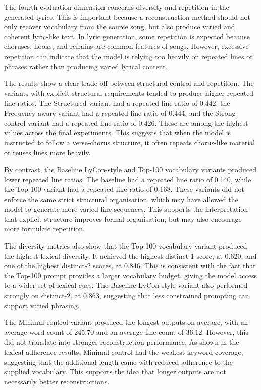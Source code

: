 The fourth evaluation dimension concerns diversity and repetition in the generated lyrics. This is important because a reconstruction method should not only recover vocabulary from the source song, but also produce varied and coherent lyric-like text. In lyric generation, some repetition is expected because choruses, hooks, and refrains are common features of songs. However, excessive repetition can indicate that the model is relying too heavily on repeated lines or phrases rather than producing varied lyrical content.

The results show a clear trade-off between structural control and repetition. The variants with explicit structural requirements tended to produce higher repeated line ratios. The Structured variant had a repeated line ratio of 0.442, the Frequency-aware variant had a repeated line ratio of 0.444, and the Strong control variant had a repeated line ratio of 0.426. These are among the highest values across the final experiments. This suggests that when the model is instructed to follow a verse-chorus structure, it often repeats chorus-like material or reuses lines more heavily.

By contrast, the Baseline LyCon-style and Top-100 vocabulary variants produced lower repeated line ratios. The baseline had a repeated line ratio of 0.140, while the Top-100 variant had a repeated line ratio of 0.168. These variants did not enforce the same strict structural organisation, which may have allowed the model to generate more varied line sequences. This supports the interpretation that explicit structure improves formal organisation, but may also encourage more formulaic repetition.

The diversity metrics also show that the Top-100 vocabulary variant produced the highest lexical diversity. It achieved the highest distinct-1 score, at 0.620, and one of the highest distinct-2 scores, at 0.846. This is consistent with the fact that the Top-100 prompt provides a larger vocabulary budget, giving the model access to a wider set of lexical cues. The Baseline LyCon-style variant also performed strongly on distinct-2, at 0.863, suggesting that less constrained prompting can support varied phrasing.

The Minimal control variant produced the longest outputs on average, with an average word count of 245.70 and an average line count of 36.12. However, this did not translate into stronger reconstruction performance. As shown in the lexical adherence results, Minimal control had the weakest keyword coverage, suggesting that the additional length came with reduced adherence to the supplied vocabulary. This supports the idea that longer outputs are not necessarily better reconstructions.

